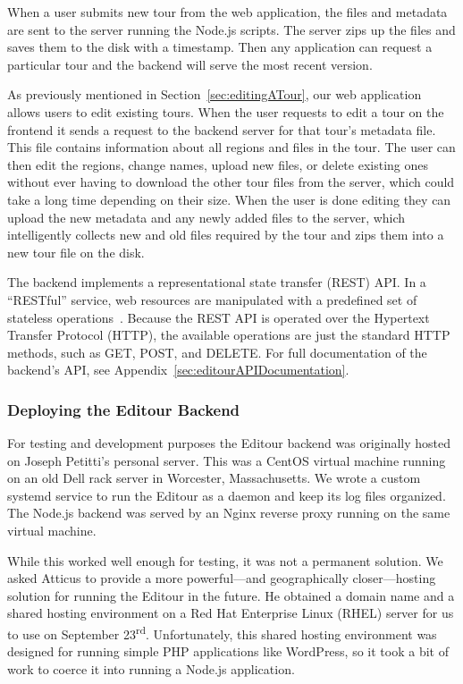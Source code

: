 \documentclass[a4paper, 10pt, american, titlepage]{article}
\begin{document}
When a user submits new tour from the web application, the files and metadata
are sent to the server running the Node.js scripts. The server zips up the files
and saves them to the disk with a timestamp. Then any application can request a
particular tour and the backend will serve the most recent version.

As previously mentioned in Section~\ref{sec:editingATour}, our web application
allows users to edit existing tours. When the user requests to edit a tour on
the frontend it sends a request to the backend server for that tour's metadata
file. This file contains information about all regions and files in the tour.
The user can then edit the regions, change names, upload new files, or delete
existing ones without ever having to download the other tour files from the
server, which could take a long time depending on their size. When the user is
done editing they can upload the new metadata and any newly added files to the
server, which intelligently collects new and old files required by the tour and
zips them into a new tour file on the disk.

The backend implements a representational state transfer (REST) API.
In a ``RESTful'' service, web resources are manipulated with a predefined set of
stateless operations~\autocite{rfc7231}. Because the REST API is operated over
the Hypertext Transfer Protocol (HTTP), the available operations are just the
standard HTTP methods, such as GET, POST, and DELETE. For full documentation of
the backend's API, see Appendix~\ref{sec:editourAPIDocumentation}.

\subsubsection{Deploying the Editour Backend}
\label{sec:deployingTheEditourBackend}

For testing and development purposes the Editour backend was originally hosted
on Joseph Petitti's personal server. This was a CentOS virtual machine running
on an old Dell rack server in Worcester, Massachusetts. We wrote a custom
systemd service to run the Editour as a daemon and keep its log files organized.
The Node.js backend was served by an Nginx reverse proxy running on the same
virtual machine.

While this worked well enough for testing, it was not a permanent solution. We
asked Atticus to provide a more powerful---and geographically closer---hosting
solution for running the Editour in the future. He obtained a domain name and a
shared hosting environment on a Red Hat Enterprise Linux (RHEL) server for us to
use on September 23\textsuperscript{rd}. Unfortunately, this shared hosting
environment was designed for running simple PHP applications like WordPress, so
it took a bit of work to coerce it into running a Node.js application.
\end{document}
